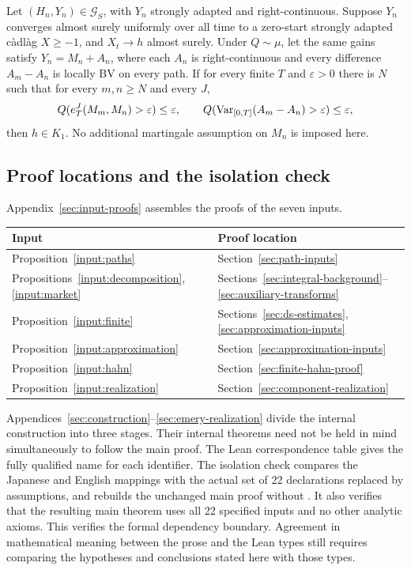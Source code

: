 \begin{proposition}\label{input:realization}
Let $(H_n,Y_n)\in\mathcal G_S$, with $Y_n$ strongly adapted and right-continuous.
Suppose $Y_n$ converges almost surely uniformly over all time to a zero-start strongly adapted c\`adl\`ag $X\geq-1$, and $X_t\to h$ almost surely.
Under $Q\sim\mu$, let the same gains satisfy $Y_n=M_n+A_n$, where each $A_n$ is right-continuous and every difference $A_m-A_n$ is locally BV on every path.
If for every finite $T$ and $\varepsilon>0$ there is $N$ such that for every $m,n\geq N$ and every $J$,
\[
 Q(e_T^J(M_m,M_n)>\varepsilon)\leq\varepsilon,
 \qquad Q(\operatorname{Var}_{[0,T]}(A_m-A_n)>\varepsilon)\leq\varepsilon,
\]
then $h\in K_1$. No additional martingale assumption on $M_n$ is imposed here.
\end{proposition}

\subsection{Proof locations and the isolation check}
Appendix~\ref{sec:input-proofs} assembles the proofs of the seven inputs.
\begin{center}\small
\begin{tabular}{ll}
\toprule Input & Proof location\\\midrule
Proposition~\ref{input:paths} & Section~\ref{sec:path-inputs}\\
Propositions~\ref{input:decomposition}, \ref{input:market} & Sections~\ref{sec:integral-background}--\ref{sec:auxiliary-transforms}\\
Proposition~\ref{input:finite} & Sections~\ref{sec:ds-estimates}, \ref{sec:approximation-inputs}\\
Proposition~\ref{input:approximation} & Section~\ref{sec:approximation-inputs}\\
Proposition~\ref{input:hahn} & Section~\ref{sec:finite-hahn-proof}\\
Proposition~\ref{input:realization} & Section~\ref{sec:component-realization}\\\bottomrule
\end{tabular}\end{center}
Appendices~\ref{sec:construction}--\ref{sec:emery-realization} divide the internal construction into three stages.
Their internal theorems need not be held in mind simultaneously to follow the main proof.
The Lean correspondence table gives the fully qualified name for each identifier.
The isolation check compares the Japanese and English mappings with the actual set of 22 declarations replaced by assumptions,
and rebuilds the unchanged main proof without .
It also verifies that the resulting main theorem uses all 22 specified inputs and no other analytic axioms.
This verifies the formal dependency boundary. Agreement in mathematical meaning between the prose and the Lean types
still requires comparing the hypotheses and conclusions stated here with those types.
